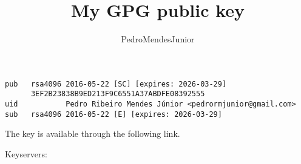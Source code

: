 

% 

\renewcommand\highlightauthorname[1]{#1}

\title{My GPG public key}
\author{\gls{PedroMendesJunior}\\%
}
\date{}



\maketitle

\begin{verbatim}
pub   rsa4096 2016-05-22 [SC] [expires: 2026-03-29]
      3EF2B23838B9ED213F9C6551A37ABDFE08392555
uid           Pedro Ribeiro Mendes Júnior <pedrormjunior@gmail.com>
sub   rsa4096 2016-05-22 [E] [expires: 2026-03-29]
\end{verbatim}

The key is available through the following link.

\begin{center}
\end{center}

Keyservers:

\\





